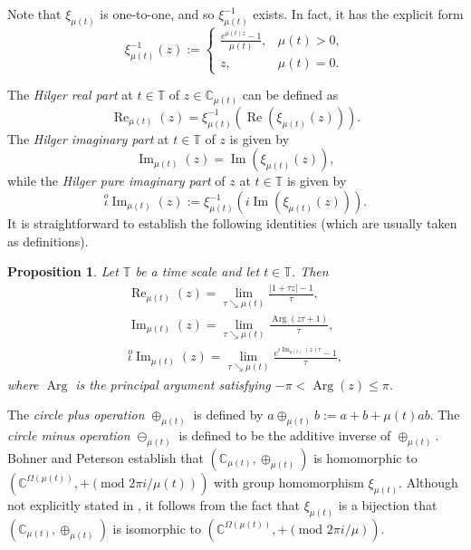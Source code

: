 \documentclass[10pt,a4paper]{amsart}
\DeclareMathOperator{\myRe}{Re}
\DeclareMathOperator{\myIm}{Im}
\numberwithin{equation}{section}
\newtheorem{proposition}[theorem]{Proposition}
\begin{document}
Note that $\xi_{\mu(t)}$ is one-to-one, and so $\xi_{\mu(t)}^{-1}$ exists.
In fact, it has the explicit form
\begin{equation}\label{invcyl}
 \xi_{\mu(t)}^{-1}(z):=
 \begin{cases}
 \frac{e^{\mu(t) z} -1}{\mu(t)}, & \mu(t)>0,\\
 z, & \mu(t)=0.
 \end{cases}
 \end{equation}

The \emph{Hilger real part} at $t\in\mathbb{T}$ of $z \in \mathbb{C}_{\mu(t)}$ can be defined as
 $$
 \myRe_{\mu(t)}(z)= \xi_{\mu(t)}^{-1}(\myRe(\xi_{\mu(t)}(z))).
 $$
The \emph{Hilger imaginary part} at $t \in \mathbb{T}$ of $z$ is given by
 $$
 \myIm_{\mu(t)}(z) = \myIm(\xi_{\mu(t)}(z)),
 $$
while the \emph{Hilger pure imaginary part} of $z$ at $t \in \mathbb{T}$ is given by
 $$
 \stackrel{o}{\iota} \myIm_{\mu(t)}(z) := \xi^{-1}_{\mu(t)}( i \myIm(\xi_{\mu(t)}(z))).
 $$
It is straightforward to establish the following identities (which are usually taken as definitions).

\begin{proposition} \label{lem:HilXi}
Let $\mathbb{T}$ be a time scale and let $t \in \mathbb{T}$. Then
\begin{gather*}
\myRe_{\mu(t)}(z)  = \lim_{\tau \searrow \mu(t)} \frac{|1+\tau z|-1}{\tau}, \\
\myIm_{\mu(t)}(z)  = \lim_{\tau \searrow \mu(t)}\frac{\operatorname{Arg}(z\tau+1)}{\tau}, \\
\stackrel{o}{\iota} \myIm_{\mu(t)}(z)
 = \lim_{\tau \searrow \mu(t)}\frac{e^{i \myIm_{\mu(t)}(z) \tau}-1}{\tau},
\end{gather*}
where $\operatorname{Arg}$ is the principal argument satisfying $-\pi < \operatorname{Arg}(z) \leq \pi$.
\end{proposition}

The \emph{circle plus operation} $\oplus_{\mu(t)}$ is defined by
$a \oplus_{\mu(t)} b:=a+b+\mu(t) ab$. The \emph{circle minus operation}
$\ominus_{\mu(t)}$ is defined to be the additive inverse of $\oplus_{\mu(t)}$.
Bohner and Peterson
\cite[Theorem~2.24]{BoPeD}  establish that $(\mathbb{C}_{\mu(t)}, \oplus_{\mu(t)})$
is homomorphic to $(\mathbb{C}^{\Omega(\mu(t))},+ (\text{mod } 2 \pi i/\mu(t)))$ with
group homomorphism $\xi_{\mu(t)}$. Although not explicitly stated in \cite{BoPeD},
it follows from the fact that
$\xi_{\mu(t)}$ is a bijection that
$(\mathbb{C}_{\mu(t)}, \oplus_{\mu(t)})$ is isomorphic to
$(\mathbb{C}^{\Omega(\mu(t))},+ (\text{mod } 2 \pi i/\mu) )$.
\end{document}
